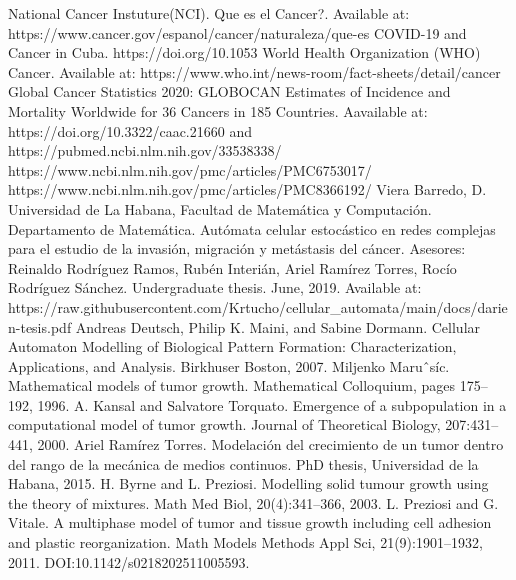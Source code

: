 \printbibliography[heading=bibintoc]
\begin{thebibliography}{99}

\vskip 0.2cm
National Cancer Instuture(NCI). Que es el Cancer?. Available at: https://www.cancer.gov/espanol/cancer/naturaleza/que-es
\vskip 0.2cm
 COVID-19 and Cancer in Cuba. https://doi.org/10.1053%
\vskip 0.2cm
World Health Organization (WHO) Cancer. Available at: https://www.who.int/news-room/fact-sheets/detail/cancer
\vskip 0.2cm
Global Cancer Statistics 2020: GLOBOCAN Estimates of Incidence and Mortality Worldwide for 36 Cancers in 185 Countries. Aavailable at: https://doi.org/10.3322/caac.21660 and https://pubmed.ncbi.nlm.nih.gov/33538338/
\vskip 0.2cm
https://www.ncbi.nlm.nih.gov/pmc/articles/PMC6753017/
\vskip 0.2cm
https://www.ncbi.nlm.nih.gov/pmc/articles/PMC8366192/
\vskip 0.2cm
Viera Barredo, D. Universidad de La Habana, Facultad de Matemática y Computación. Departamento de Matemática. Autómata celular estocástico en redes complejas para el estudio de la invasión, migración y metástasis del cáncer. Asesores: Reinaldo Rodríguez Ramos, Rubén Interián, Ariel Ramírez Torres, Rocío Rodríguez Sánchez. Undergraduate thesis. June, 2019. Available at: https://raw.githubusercontent.com/Krtucho/cellular\_automata/main/docs/darien-tesis.pdf
\vskip 0.2cm
Andreas Deutsch, Philip K. Maini, and Sabine Dormann. Cellular Automaton Modelling of Biological Pattern Formation: Characterization, Applications, and Analysis. Birkhuser Boston, 2007.
\vskip 0.2cm
Miljenko Maruˆs\'ic. Mathematical models of tumor growth. Mathematical Colloquium, pages 175–192, 1996.
\vskip 0.2cm
A. Kansal and Salvatore Torquato. Emergence of a subpopulation in a computational model of tumor growth. Journal of Theoretical Biology, 207:431–441, 2000.
\vskip 0.2cm
Ariel Ram\'irez Torres. Modelaci\'on del crecimiento de un tumor dentro del rango de la mec\'anica de medios continuos. PhD thesis, Universidad de la Habana, 2015.
\vskip 0.2cm
H. Byrne and L. Preziosi. Modelling solid tumour growth using the theory of mixtures. Math Med Biol, 20(4):341–366, 2003.
\vskip 0.2cm
L. Preziosi and G. Vitale. A multiphase model of tumor and tissue growth including cell adhesion and plastic reorganization. Math Models Methods Appl Sci, 21(9):1901–1932, 2011. DOI:10.1142/s0218202511005593.

\end{thebibliography}
